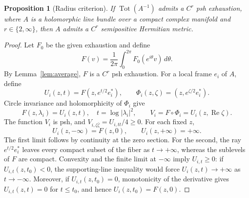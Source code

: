 \documentclass[11pt]{amsart}
\newtheorem{proposition}[theorem]{Proposition}
\theoremstyle{definition}
\theoremstyle{remark}
\numberwithin{equation}{section}
\newcommand{\Tot}{\operatorname{Tot}}
\begin{document}
\begin{proposition}[Radius criterion]\label{prop:radius}
If $\Tot(A^{-1})$ admits a $C^r$ psh exhaustion, where $A$ is a
holomorphic line bundle over a compact complex manifold and
$r\in\{2,\infty\}$, then $A$ admits a $C^r$ semipositive
Hermitian metric.
\end{proposition}
\begin{proof}
Let $F_0$ be the given exhaustion and define
\[
 F(v)=\frac1{2\pi}\int_0^{2\pi}F_0(e^{i\theta}v)\,d\theta.
\]
By Lemma~\ref{lem:average}, $F$ is a $C^r$ psh exhaustion.
For a local frame $e_i$ of $A$, define
\[
 U_i(z,t)=F(z,e^{t/2}e_i^*),\qquad
 \Phi_i(z,\zeta)=(z,e^{\zeta/2}e_i^*).
\]
Circle invariance and holomorphicity of $\Phi_i$ give
\[
 F(z,\lambda_i)=U_i(z,t),\quad t=\log|\lambda_i|^2,
 \qquad V_i=F\circ\Phi_i=U_i(z,\operatorname{Re}\zeta).
\]
The function $V_i$ is psh, and
$V_{i,\zeta\bar\zeta}=U_{i,tt}/4\ge0$. For each fixed $z$,
\[
 U_i(z,-\infty)=F(z,0),\qquad U_i(z,+\infty)=+\infty.
\]
The first limit follows by continuity at the zero section. For the
second, the ray $e^{t/2}e_i^*$ leaves every compact subset of the
fiber as $t\to+\infty$, whereas the sublevels of $F$ are compact.
Convexity and the finite limit at $-\infty$ imply $U_{i,t}\ge0$:
if $U_{i,t}(z,t_0)<0$, the supporting-line inequality would force
$U_i(z,t)\to+\infty$ as $t\to-\infty$.
Moreover, if $U_{i,t}(z,t_0)=0$, monotonicity of the derivative gives
$U_{i,t}(z,t)=0$ for $t\le t_0$, and hence
$U_i(z,t_0)=F(z,0)$.


\end{proof}
\end{document}

